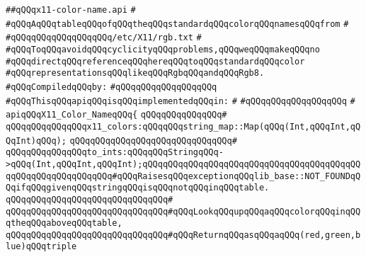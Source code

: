 \label{src/lib/x-kit/xclient/src/color/x11-color-name.api}
\verb|##qQQqx11-color-name.api|\newline
\verb|#|\newline
\verb|#qQQqAqQQqtableqQQqofqQQqtheqQQqstandardqQQqcolorqQQqnamesqQQqfrom|\newline
\verb|#|\newline
\verb|#qQQqqQQqqQQqqQQqqQQq/etc/X11/rgb.txt|\newline
\verb|#|\newline
\verb|#qQQqToqQQqavoidqQQqcyclicityqQQqproblems,qQQqweqQQqmakeqQQqno|\newline
\verb|#qQQqdirectqQQqreferenceqQQqhereqQQqtoqQQqstandardqQQqcolor|\newline
\verb|#qQQqrepresentationsqQQqlikeqQQqRgbqQQqandqQQqRgb8.|\newline
\newline
\verb|#qQQqCompiledqQQqby:|\newline
\verb|#qQQqqQQqqQQqqQQqqQQq|\newline
\newline
\verb|#qQQqThisqQQqapiqQQqisqQQqimplementedqQQqin:|\newline
\verb|#|\newline
\verb|#qQQqqQQqqQQqqQQqqQQq|\newline
\verb|#|\newline
\verb|apiqQQqX11_Color_NameqQQq{|\newline
\verb|qQQqqQQqqQQqqQQq#|\newline
\verb|qQQqqQQqqQQqqQQqx11_colors:qQQqqQQqstring_map::Map(qQQq(Int,qQQqInt,qQQqInt)qQQq);|\newline
\verb|qQQqqQQqqQQqqQQqqQQqqQQqqQQqqQQq#|\newline
\newline
\verb|qQQqqQQqqQQqqQQqto_ints:qQQqqQQqStringqQQq->qQQq(Int,qQQqInt,qQQqInt);qQQqqQQqqQQqqQQqqQQqqQQqqQQqqQQqqQQqqQQqqQQqqQQqqQQqqQQqqQQqqQQq#qQQqRaisesqQQqexceptionqQQqlib_base::NOT_FOUNDqQQqifqQQqgivenqQQqstringqQQqisqQQqnotqQQqinqQQqtable.|\newline
\verb|qQQqqQQqqQQqqQQqqQQqqQQqqQQqqQQq#|\newline
\verb|qQQqqQQqqQQqqQQqqQQqqQQqqQQqqQQq#qQQqLookqQQqupqQQqaqQQqcolorqQQqinqQQqtheqQQqaboveqQQqtable,|\newline
\verb|qQQqqQQqqQQqqQQqqQQqqQQqqQQqqQQq#qQQqReturnqQQqasqQQqaqQQq(red,green,blue)qQQqtriple|\newline
